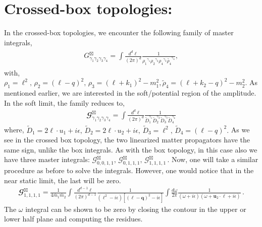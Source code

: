 \section*{Crossed-box topologies:}
In the crossed-box topologies, we encounter the following family of master integrals,
\begin{align}
    \begin{split}
        G^{\boxtimes}_{\gamma_1\gamma_2\gamma_3\gamma_4}=\int \frac{d^d\ell}{(2\pi)^d} \frac{1}{{\rho_1}^{\gamma_1}{\rho_2}^{\gamma_2}{\rho_4}^{\gamma_3}\tilde{\rho_4}^{\gamma_4}},
    \end{split}
\end{align}
with,  $\rho_1=\ell^2,\,\rho_2=(\ell-q)^2,\,\rho_3=(\ell+k_1)^2-m_1^2, \tilde\rho_4=(\ell+k_2-q)^2-m_2^2$. As mentioned earlier, we are interested in the soft/potential region of the amplitude. In the soft limit, the family reduces to,
\begin{align}
     \mathbfcal{G}^{\boxtimes}
_{\gamma_1\gamma_2\gamma_3\gamma_4}=\int \frac{d^d\ell}{(2\pi)^d}\frac{1}{\tilde D_1^{\gamma_1}\tilde D_2^{\gamma_2}\tilde D_3^{\gamma_3}\tilde D_4^{\gamma_4}}
\end{align}
where, 
$\tilde D_1=2\ell\cdot u_1+i\epsilon, \,\tilde D_2=2\ell\cdot u_2+i\epsilon,\, \tilde D_3=\ell^2,\,\tilde D_4=(\ell-q)^2. $ As we see in the crossed box topology, the two linearized matter propagators have the same sign, unlike the box integrals. As with the box topology, in this case also we have three master integrals: $\mathcal{G}_{0,0,1,1}^{\boxtimes},\,\mathcal{G}_{0,1,1,1}^{\boxtimes},\,\mathcal{G}_{1,1,1,1}^{\boxtimes}\,.$ Now, one will take a similar procedure as before to solve the integrals. However, one would notice that in the near static limit, the last will be zero.
\begin{align}\label{3.28} \mathbfcal{G}_{1,1,1,1}^{\boxtimes}=\frac{1}{4\bar{m}_1\bar{m}_2}\int \frac{d^{d-1}\boldsymbol{\ell}}{(2\pi)^{d-1}}\frac{1}{(\boldsymbol{\ell}^2-i\epsilon)\left[(\boldsymbol{\ell}-\boldsymbol{q})^2-i\epsilon\right]}\int \frac{d\omega}{2\pi} \frac{1}{(\omega+i\epsilon)(\omega+\boldsymbol{u}_2\cdot\boldsymbol{\ell}+i\epsilon)}\,.
\end{align}
The $\omega$ integral can be shown to be zero by closing the contour in the upper or lower half plane and computing the residues.
